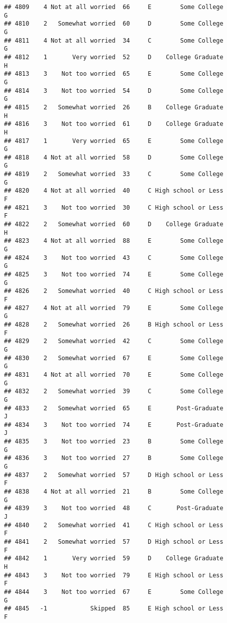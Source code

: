 \documentclass[
]{article}
\begin{document}
\begin{verbatim}
## 4809    4 Not at all worried  66     E        Some College         G
## 4810    2   Somewhat worried  60     D        Some College         G
## 4811    4 Not at all worried  34     C        Some College         G
## 4812    1       Very worried  52     D    College Graduate         H
## 4813    3    Not too worried  65     E        Some College         G
## 4814    3    Not too worried  54     D        Some College         G
## 4815    2   Somewhat worried  26     B    College Graduate         H
## 4816    3    Not too worried  61     D    College Graduate         H
## 4817    1       Very worried  65     E        Some College         G
## 4818    4 Not at all worried  58     D        Some College         G
## 4819    2   Somewhat worried  33     C        Some College         G
## 4820    4 Not at all worried  40     C High school or Less         F
## 4821    3    Not too worried  30     C High school or Less         F
## 4822    2   Somewhat worried  60     D    College Graduate         H
## 4823    4 Not at all worried  88     E        Some College         G
## 4824    3    Not too worried  43     C        Some College         G
## 4825    3    Not too worried  74     E        Some College         G
## 4826    2   Somewhat worried  40     C High school or Less         F
## 4827    4 Not at all worried  79     E        Some College         G
## 4828    2   Somewhat worried  26     B High school or Less         F
## 4829    2   Somewhat worried  42     C        Some College         G
## 4830    2   Somewhat worried  67     E        Some College         G
## 4831    4 Not at all worried  70     E        Some College         G
## 4832    2   Somewhat worried  39     C        Some College         G
## 4833    2   Somewhat worried  65     E       Post-Graduate         J
## 4834    3    Not too worried  74     E       Post-Graduate         J
## 4835    3    Not too worried  23     B        Some College         G
## 4836    3    Not too worried  27     B        Some College         G
## 4837    2   Somewhat worried  57     D High school or Less         F
## 4838    4 Not at all worried  21     B        Some College         G
## 4839    3    Not too worried  48     C       Post-Graduate         J
## 4840    2   Somewhat worried  41     C High school or Less         F
## 4841    2   Somewhat worried  57     D High school or Less         F
## 4842    1       Very worried  59     D    College Graduate         H
## 4843    3    Not too worried  79     E High school or Less         F
## 4844    3    Not too worried  67     E        Some College         G
## 4845   -1            Skipped  85     E High school or Less         F

\end{verbatim}
\end{document}
